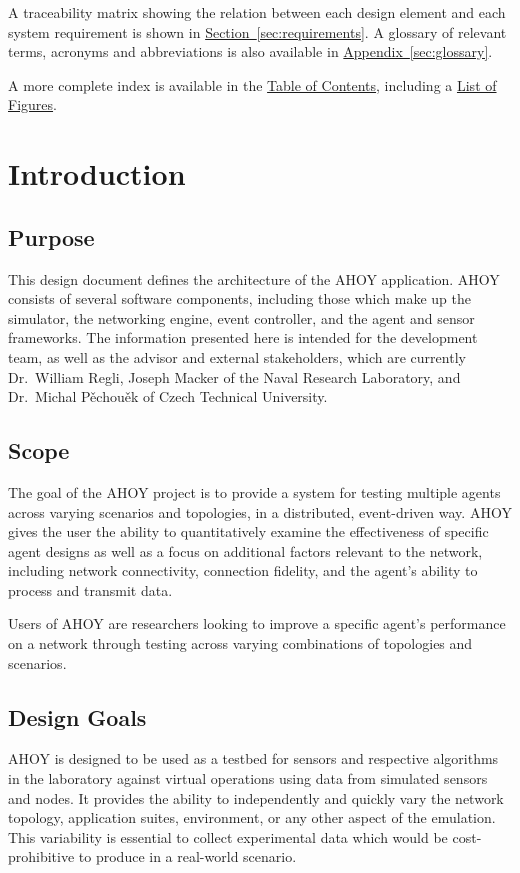 \documentclass[titlepage]{article}
\newcommand{\rrref}[2]{\hyperref[#2]{#1}}
\newcommand{\sref}[1]{\hyperref[#1]{Section~\ref*{#1}}}
\newcommand{\aref}[1]{\hyperref[#1]{Appendix~\ref*{#1}}}
\begin{document}
A traceability matrix showing the relation between each design element and each system requirement is shown in \sref{sec:requirements}. A glossary of relevant terms, acronyms and abbreviations is also available in \aref{sec:glossary}.

A more complete index is available in the \rrref{Table of Contents}{toc}, including a \rrref{List of Figures}{lof}. 

\section{Introduction}
\label{sec:introduction}
\subsection{Purpose}
\label{sec:purpose}
This design document defines the architecture of the AHOY application. AHOY consists of several software components, including those which make up the simulator, the networking engine, event controller, and the agent and sensor frameworks. The information presented here is intended for the development team, as well as the advisor and external stakeholders, which are currently Dr.~William Regli, Joseph Macker of the Naval Research Laboratory, and Dr.~Michal P\v{e}chou\v{e}k of Czech Technical University. 

\subsection{Scope}
The goal of the AHOY project is to provide a system for testing multiple agents across varying scenarios and topologies, in a distributed, event-driven way. AHOY gives the user the ability to quantitatively examine the effectiveness of specific agent designs as well as a focus on additional factors relevant to the network, including network connectivity, connection fidelity, and the agent's ability to process and transmit data.

Users of AHOY are researchers looking to improve a specific agent's performance on a network through testing across varying combinations of topologies and scenarios.

\subsection{Design Goals}
AHOY is designed to be used as a testbed for sensors and respective algorithms in the laboratory against virtual operations using data from simulated sensors and nodes. It provides the ability to independently and quickly vary the network topology, application suites, environment, or any other aspect of the emulation. This variability is essential to collect experimental data which would be cost-prohibitive to produce in a real-world scenario. 
\end{document}
